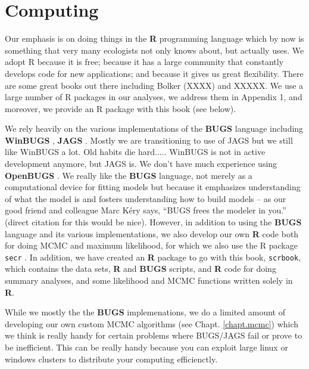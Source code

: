 \section*{Computing}

Our emphasis is on doing things in the {\bf R} programming language
which by now is something that very many ecologists not only knows
about, but actually uses. We adopt R because it is free; because it
has a large community that constantly develops code for new
applications; and because it gives us great flexibility.  There are
some great books out there including Bolker (XXXX) and XXXXX. We use a
large number of R packages in our analyses, we address them in
Appendix 1, and moreover, we provide an R package with this book (see
below).

We rely heavily on the various implementations of the
{\bf BUGS} language including {\bf WinBUGS} \citep{lunn_etal:2000},
{\bf JAGS} \citep{plummer:2003}. 
 Mostly we are transitioning to use of JAGS but we
still like WinBUGS a lot. Old habits die hard..... WinBUGS is not in
active development anymore, but JAGS is. We don't have much experience
using {\bf OpenBUGS}
 \citep{thomas_etal:2006}. We really like
the {\bf BUGS} language, not merely  as a computational device for
fitting models but because it emphasizes
understanding of what the model is and fosters understanding how to
build models -- as  our good friend and colleague Marc K\'{e}ry says,
``BUGS frees the modeler in you.''  (direct
citation for this would be nice).  However, in addition to using the
{\bf BUGS} language and its various implementations, we also develop our own
{\bf R} code both for doing MCMC
and maximum likelihood, for which we also use the R
package \mbox{\tt secr} \citep{efford:2011}. In addition, we have
created an {\bf R} package to go with this book, \mbox{\tt scrbook},
which contains the data sets, {\bf R} and {\bf BUGS} scripts, and {\bf
  R} code for doing summary analyses, and some likelihood and MCMC
functions written solely in {\bf R}.

While we mostly  the the {\bf BUGS} implemenations, we do a limited amount of developing our own custom MCMC algorithms
(see Chapt. \ref{chapt.mcmc}) which we think is really handy for certain
problems where BUGS/JAGS fail or prove to be inefficient.
This can be  really handy because you can exploit large linux or
windows clusters to distribute your computing efficienctly.

